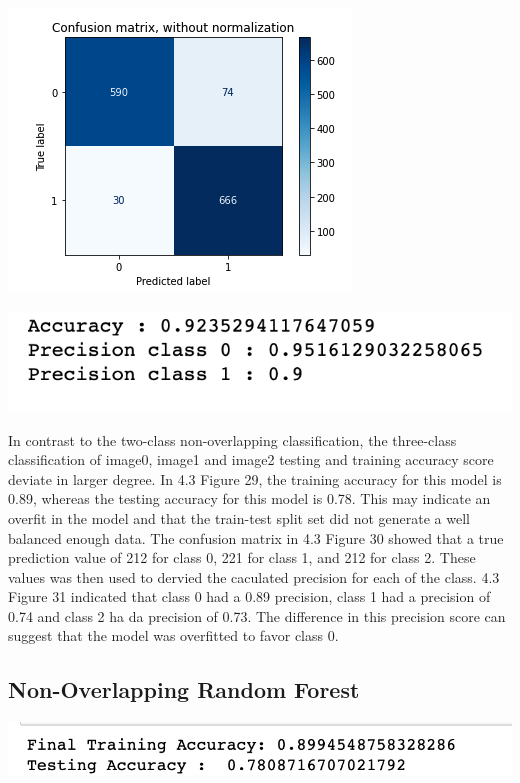 \documentclass[12pt]{article}
\begin{document}
\begin{multicols*}{2}
\begin{center}
		\includegraphics[scale=0.5]{../screenshot/Rf-Overlapping01/cf.png}

		\includegraphics[scale=0.5]{../screenshot/Rf-Overlapping01/calc_score.png}
  \end{center}

  \hspace*{5mm} In contrast to the two-class non-overlapping classification, the three-class
  classification of image0, image1 and image2 testing and training accuracy score deviate in larger degree.
  In 4.3 Figure 29, the training accuracy for this model is 0.89, whereas the testing accuracy for this model is 
  0.78. This may indicate an overfit in the model and that the train-test split set did not generate a well balanced enough data.
  The confusion matrix in 4.3 Figure 30 showed that a true prediction value of 212 for class 0, 221 for class 1, and 212 for class 2.
  These values was then used to dervied the caculated precision for each of the class. 4.3 Figure 31 indicated that class 0 had a 0.89 precision,
  class 1 had a precision of 0.74 and class 2 ha da precision of 0.73. The difference in this precision score can suggest that the model
  was overfitted to favor class 0. 
  \subsection{Non-Overlapping Random Forest} 
  \begin{center}
		\includegraphics[scale=0.5]{../screenshot/Rf-Non-Overlapping012/score.png}


\end{center}
\end{multicols*}
\end{document}
